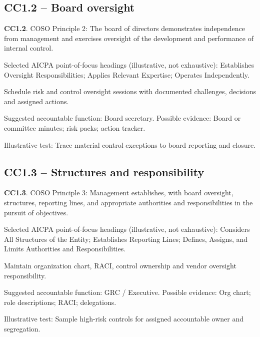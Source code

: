 \documentclass[10pt,oneside]{report}
\begin{document}
\subsection*{CC1.2 -- Board oversight}
\begin{aicpabox}
\textbf{CC1.2}. COSO Principle 2: The board of directors demonstrates independence from management and exercises oversight of the development and performance of internal control.\par{}
\end{aicpabox}
Selected AICPA point-of-focus headings (illustrative, not exhaustive): Establishes Oversight Responsibilities; Applies Relevant Expertise; Operates Independently.

\begin{engineeringbox}
Schedule risk and control oversight sessions with documented challenges, decisions and assigned actions.
\end{engineeringbox}
Suggested accountable function: Board secretary. Possible evidence: Board or committee minutes; risk packs; action tracker.

Illustrative test: Trace material control exceptions to board reporting and closure.

\subsection*{CC1.3 -- Structures and responsibility}
\begin{aicpabox}
\textbf{CC1.3}. COSO Principle 3: Management establishes, with board oversight, structures, reporting lines, and appropriate authorities and responsibilities in the pursuit of objectives.\par{}
\end{aicpabox}
Selected AICPA point-of-focus headings (illustrative, not exhaustive): Considers All Structures of the Entity; Establishes Reporting Lines; Defines, Assigns, and Limits Authorities and Responsibilities.

\begin{engineeringbox}
Maintain organization chart, RACI, control ownership and vendor oversight responsibility.
\end{engineeringbox}
Suggested accountable function: GRC / Executive. Possible evidence: Org chart; role descriptions; RACI; delegations.

Illustrative test: Sample high-risk controls for assigned accountable owner and segregation.
\end{document}
